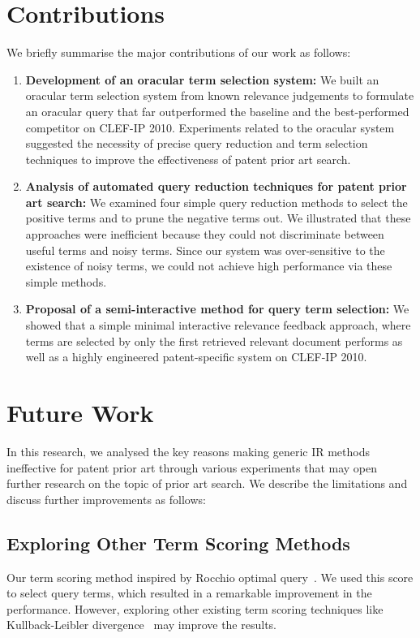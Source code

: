 \section{Contributions}
\label{sec:contributions}
We briefly summarise the major contributions of our work as follows:
\begin{enumerate}
\item \textbf{Development of an oracular term selection system: }We built an oracular term selection system from known relevance judgements to formulate an oracular query that far outperformed the baseline and the best-performed competitor on CLEF-IP 2010. 
Experiments related to the oracular system suggested the necessity of precise query
reduction and term selection techniques to improve the effectiveness of patent
prior art search.
\item \textbf{Analysis of automated query reduction techniques for patent prior art search: } We examined four simple query reduction methods to select the positive terms and to prune the negative terms out. We illustrated that these approaches were inefficient because they could not discriminate between useful terms and noisy terms. Since our system was over-sensitive to the existence of noisy terms, we could not achieve high performance via these simple methods. 
\item \textbf{Proposal of a semi-interactive method for query term selection: }We showed that a simple minimal interactive relevance feedback approach, where terms are selected by only the first retrieved relevant document performs as well as a highly engineered patent-specific system on CLEF-IP 2010. 
\end{enumerate}

\section{Future Work}
\label{sec:future}
In this research, we analysed the key reasons making generic IR methods ineffective for patent prior art through various experiments that may open further research on the topic of prior art search. We describe the limitations and discuss further improvements as follows: 
\subsection{Exploring Other Term Scoring Methods}
\label{subsec:ExploringTermScoringMethods}
Our term scoring method inspired by Rocchio optimal query~\citep{manning2008introduction}. We used this score to select query terms, which resulted in a remarkable improvement in the performance. However, exploring other existing term scoring techniques like Kullback-Leibler divergence~\citep{Baeza-Yates2011} may improve the results.

